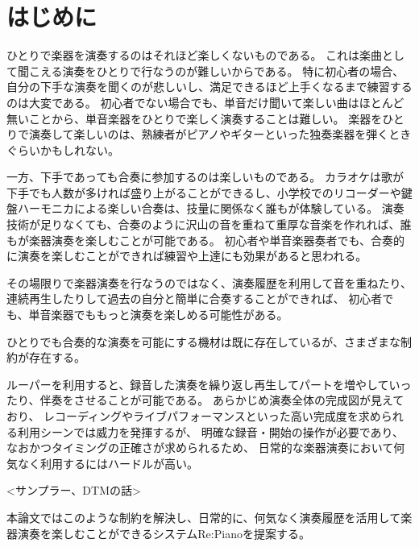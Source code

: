 \section{はじめに}
\label{sec:start}

ひとりで楽器を演奏するのはそれほど楽しくないものである。
これは楽曲として聞こえる演奏をひとりで行なうのが難しいからである。
特に初心者の場合、 自分の下手な演奏を聞くのが悲しいし、満足できるほど上手くなるまで練習するのは大変である。
初心者でない場合でも、単音だけ聞いて楽しい曲はほとんど無いことから、単音楽器をひとりで楽しく演奏することは難しい。
楽器をひとりで演奏して楽しいのは、熟練者がピアノやギターといった独奏楽器を弾くときぐらいかもしれない。

一方、下手であっても合奏に参加するのは楽しいものである。
カラオケは歌が下手でも人数が多ければ盛り上がることができるし、小学校でのリコーダーや鍵盤ハーモニカによる楽しい合奏は、技量に関係なく誰もが体験している。
演奏技術が足りなくても、合奏のように沢山の音を重ねて重厚な音楽を作れれば、誰もが楽器演奏を楽しむことが可能である。
初心者や単音楽器奏者でも、合奏的に演奏を楽しむことができれば練習や上達にも効果があると思われる。

その場限りで楽器演奏を行なうのではなく、演奏履歴を利用して音を重ねたり、連続再生したりして過去の自分と簡単に合奏することができれば、
初心者でも、単音楽器でももっと演奏を楽しめる可能性がある。


ひとりでも合奏的な演奏を可能にする機材は既に存在しているが、さまざまな制約が存在する。

ルーパーを利用すると、録音した演奏を繰り返し再生してパートを増やしていったり、伴奏をさせることが可能である。
あらかじめ演奏全体の完成図が見えており、
レコーディングやライブパフォーマンスといった高い完成度を求められる利用シーンでは威力を発揮するが、
明確な録音・開始の操作が必要であり、なおかつタイミングの正確さが求められるため、
日常的な楽器演奏において何気なく利用するにはハードルが高い。

<サンプラー、DTMの話>

本論文ではこのような制約を解決し、日常的に、何気なく演奏履歴を活用して楽器演奏を楽しむことができるシステムRe:Pianoを提案する。

%
